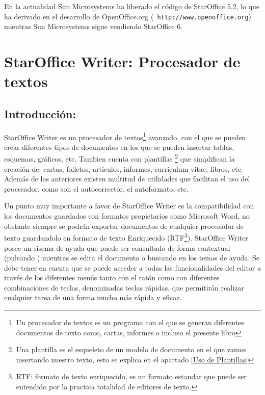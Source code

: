 En la actualidad Sun Microsystems  ha liberado el código de StarOffice
5.2,  lo que  ha derivado  en  el desarrollo  de OpenOffice.org  ({\tt
http://www.openoffice.org}) mientras Sun  Microsystems sigue vendiendo
StarOffice 6.



%

\section{StarOffice Writer: Procesador de textos}


\subsection{Introducción:}

StarOffice Writer es un procesador de textos\footnote{%
Un procesador de textos es un programa con el que se generan diferentes documentos
de texto como, cartas, informes o incluso el presente libro
} avanzado, con el que se pueden crear diferentes tipos de documentos en los
que se pueden insertar tablas, esquemas, gráficos, etc. Tambien cuenta con plantillas \footnote{%
Una plantilla es el esqueleto de un modelo de documento en el que vamos insertando
nuestro texto, esto se explica en el apartado \ref{Uso de Plantillas} 
} que simplifican la creación de: cartas, folletos, artículos, informes, curriculum
vitae, libros, etc. Además de las anteriores existen multitud de utilidades
que facilitan el uso del procesador, como son el autocorrector, el autoformato,
etc.

Un punto muy importante a favor de StarOffice Writer es la compatibilidad con los documentos
guardados con formatos propietarios como Microsoft Word, no obstante siempre
se podrán exportar documentos de cualquier procesador de texto guardandolo en
formato de texto Enriquecido (RTF\footnote{%
RTF: formato de texto enriquecido, es un formato estandar que puede ser entendido
por la practica totalidad de editores de texto.
}). StarOffice Writer posee un sisema de ayuda que puede ser consultado de forma contextual
(pulsando ) mientras se edita el documento o buscando en los temas de ayuda.
Se debe tener en cuenta que se puede acceder a todas las funcionalidades del
editor a través de los diferentes menús tanto con el ratón como con diferentes combinaciones
de teclas, denominadas teclas rápidas, que permitirán realizar cualquier tarea
de una forma mucho más rápida y eficaz.

